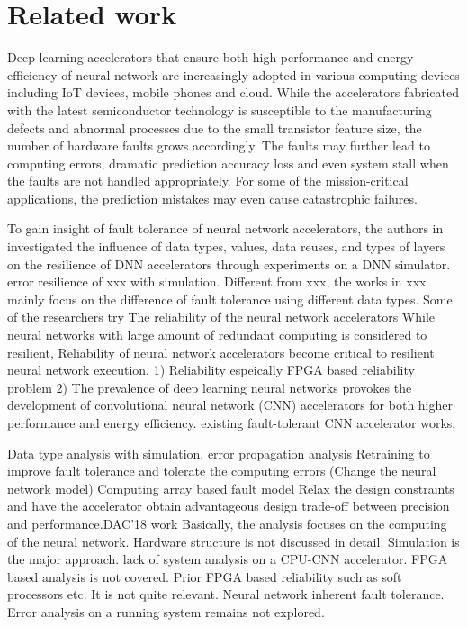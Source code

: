 \section{Related work} \label{sec:relatedwork}
Deep learning accelerators that ensure both high
performance and energy efficiency of neural network are 
increasingly adopted in various computing devices including 
IoT devices, mobile phones and cloud. While the accelerators 
fabricated with the latest semiconductor technology is 
susceptible to the manufacturing defects and abnormal 
processes due to the small transistor feature size, the 
number of hardware faults grows accordingly. The faults may 
further lead to computing errors, dramatic prediction accuracy 
loss and even system stall when the faults are not handled 
appropriately. For some of the mission-critical applications, 
the prediction mistakes may even cause catastrophic failures.

To gain insight of fault tolerance of neural network accelerators, 
the authors in \cite{Li2017} investigated the influence of data types, 
values, data reuses, and types of layers on the resilience of DNN 
accelerators through experiments on a DNN simulator. error resilience of xxx with simulation. Different from xxx,
the works in xxx mainly focus on the difference of fault tolerance using 
different data types. Some of the researchers try 
The reliability of the neural network accelerators 
While neural networks with large amount of redundant computing 
is considered to resilient, Reliability of neural network accelerators become critical 
to resilient neural network execution. 
1) Reliability espeically FPGA based reliability problem
2) The prevalence of deep learning neural networks provokes 
the development of convolutional neural network (CNN) accelerators 
for both higher performance and energy efficiency. 
existing fault-tolerant CNN accelerator works,

Data type analysis with simulation, error propagation analysis
Retraining to improve fault tolerance and tolerate the computing errors
(Change the neural network model) Computing array based fault model
Relax the design constraints and have the accelerator 
obtain advantageous design trade-off between precision and performance.DAC'18 work
Basically, the analysis focuses on the computing of the neural network.
Hardware structure is not discussed in detail. 
Simulation is the major approach.
lack of system analysis on a CPU-CNN accelerator. 
FPGA based analysis is not covered.
Prior FPGA based reliability such as soft processors etc. It is 
not quite relevant.
Neural network inherent fault tolerance.
Error analysis on a running system remains not explored. 

